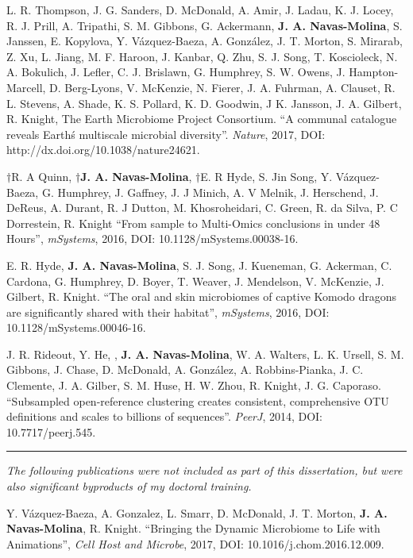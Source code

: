 \begin{frontmatter}
\begin{vitapage}
\begin{publications}
	\item L. R. Thompson, J. G. Sanders, D. McDonald, A. Amir, J. Ladau, K. J. Locey, R. J. Prill, A. Tripathi, S. M. Gibbons, G. Ackermann, \textbf{J. A. Navas-Molina}, S. Janssen, E. Kopylova, Y. V\'azquez-Baeza, A. Gonz\'alez, J. T. Morton, S. Mirarab, Z. Xu, L. Jiang, M. F. Haroon, J. Kanbar, Q. Zhu, S. J. Song, T. Koscioleck, N. A. Bokulich, J. Lefler, C. J. Brislawn, G. Humphrey, S. W. Owens, J. Hampton-Marcell, D. Berg-Lyons, V. McKenzie, N. Fierer, J. A. Fuhrman, A. Clauset, R. L. Stevens, A. Shade, K. S. Pollard, K. D. Goodwin, J K. Jansson, J. A. Gilbert, R. Knight, The Earth Microbiome Project Consortium. ``A communal catalogue reveals Earth\'s multiscale microbial diversity''. \emph{Nature}, 2017, DOI: http://dx.doi.org/10.1038/nature24621.

	\item $\dagger$R. A Quinn, \textbf{$\dagger$J. A. Navas-Molina}, $\dagger$E. R Hyde, S. Jin Song, Y. V\'azquez-Baeza, G. Humphrey, J. Gaffney, J. J Minich, A. V Melnik, J. Herschend, J. DeReus, A. Durant, R. J Dutton, M. Khosroheidari, C. Green, R. da Silva, P. C Dorrestein, R. Knight ``From sample to Multi-Omics conclusions in under 48 Hours'', \emph{mSystems}, 2016, DOI: 10.1128/mSystems.00038-16.

	\item E. R. Hyde, \textbf{J. A. Navas-Molina}, S. J. Song, J. Kueneman, G. Ackerman, C. Cardona, G. Humphrey, D. Boyer, T. Weaver, J. Mendelson, V. McKenzie, J. Gilbert, R. Knight. ``The oral and skin microbiomes of captive Komodo dragons are significantly shared with their habitat'', \emph{mSystems}, 2016, DOI: 10.1128/mSystems.00046-16.

	\item J. R. Rideout, Y. He, , \textbf{J. A. Navas-Molina}, W. A. Walters, L. K. Ursell, S. M. Gibbons, J. Chase, D. McDonald, A. Gonz\'alez, A. Robbins-Pianka, J. C. Clemente, J. A. Gilber, S. M. Huse, H. W. Zhou, R. Knight, J. G. Caporaso. ``Subsampled open-reference clustering creates consistent, comprehensive OTU definitions and scales to billions of sequences''. \emph{PeerJ}, 2014, DOI: 10.7717/peerj.545.

	\item \noindent\rule[0.5ex]{\linewidth}{0.5pt}

    \textsl{The following publications were not included as part of this dissertation, but were also significant byproducts of my doctoral training.}

	\item Y. V\'azquez-Baeza, A. Gonzalez, L. Smarr, D. McDonald, J. T. Morton, \textbf{J. A. Navas-Molina}, R. Knight. ``Bringing the Dynamic Microbiome to Life with Animations'', \emph{Cell Host and Microbe}, 2017, DOI: 10.1016/j.chom.2016.12.009.


\end{publications}
\end{vitapage}
\end{frontmatter}
